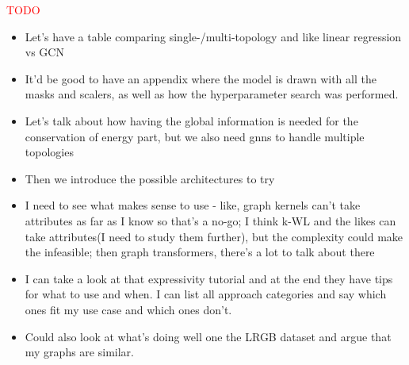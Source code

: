 \textcolor{red}{TODO}


\begin{itemize}
    \item Let's have a table comparing single-/multi-topology and like linear regression vs GCN
    \item It'd be good to have an appendix where the model is drawn with all the masks and scalers,
    as well as how the hyperparameter search was performed.
    \item Let's talk about how having the global information is needed for the conservation of energy
    part, but we also need gnns to handle multiple topologies
    \item Then we introduce the possible architectures to try
    \item I need to see what makes sense to use - like, graph kernels can't take attributes as far as I
    know so that's a no-go; I think k-WL and the likes can take attributes(I need to study them further),
    but the complexity could make the infeasible; then graph transformers, there's a lot to talk about there
    \item I can take a look at that expressivity tutorial and at the end they have tips for what to use and when.
    I can list all approach categories and say which ones fit my use case and which ones don't.
    \item Could also look at what's doing well one the LRGB dataset and argue that my graphs are similar.
\end{itemize}
